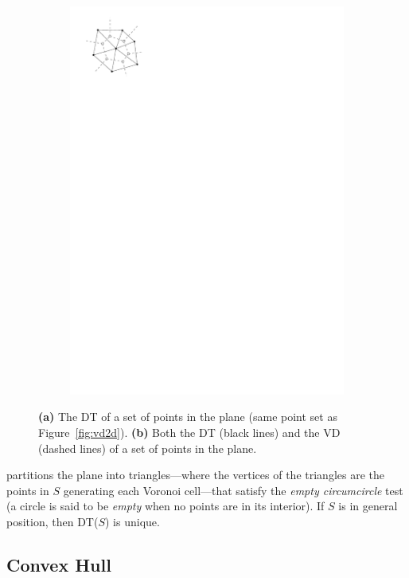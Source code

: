 \begin{figure}
\begin{subfigure}[b]{0.3\linewidth}
    \includegraphics[width=\textwidth]{figs/duality_2d}
    \caption{}\label{fig:dt2db}
  \end{subfigure}%
  \caption{\textbf{(a)} The DT of a set of points in the plane (same point set as Figure~\ref{fig:vd2d}). \textbf{(b)} Both the DT (black lines) and the VD (dashed lines) of a set of points in the plane.}
\label{fig:dt2d}
\end{figure}
partitions the plane into triangles---where the vertices of the triangles are the points in $S$ generating each Voronoi cell---that satisfy the \emph{empty circumcircle} test (a circle is said to be \emph{empty} when no points are in its interior). 
If $S$ is in general position, then DT($S$) is unique.

%
\subsection{Convex Hull}
\label{sec:convexhull}

